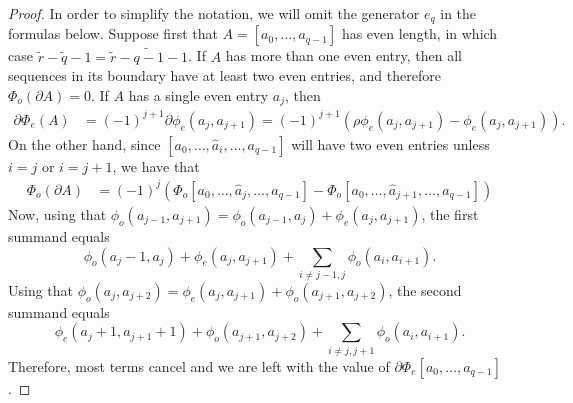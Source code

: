 \begin{proof} In order to simplify the notation, we will omit the generator $e_q$ in the formulas below. 
Suppose first that $A = [a_0,\ldots,a_{q-1}]$ has even length, in which case $\tilde{r}-\tilde{q}-1 = \tilde{r}-\widetilde{q-1}-1$. If $A$ has more than one even entry, then all sequences in its boundary have at least two even entries, and therefore $\Phi_o(\partial A) = 0$. If $A$ has a single even entry $a_j$, then 
\begin{align*}
    \partial \Phi_e(A) &= (-1)^{j+1}\partial \phi_e(a_j,a_{j+1}) = (-1)^{j+1}\left(\rho\phi_e(a_j,a_{j+1}
    ) - \phi_e(a_j,a_{j+1})\right).
\end{align*}
On the other hand, since $[a_0,\ldots,\hat{a}_i,\ldots,a_{q-1}]$ will have two even entries unless $i=j$ or $i=j+1$, we have that
\begin{align*}
    \Phi_o(\partial A) 
    &= (-1)^{j}\left(\Phi_o [a_0,\ldots,\hat{a}_j,\ldots,a_{q-1}]-\Phi_o [a_0,\ldots,\hat{a}_{j+1},\ldots,a_{q-1}]\right)
\end{align*}    
Now, using that $\phi_o(a_{j-1},a_{j+1}) = \phi_o(a_{j-1},a_j) + \phi_e(a_j,a_{j+1})$, the first summand equals
\[
\phi_o(a_j-1,a_j) + \phi_e(a_j,a_{j+1})+\sum_{i\neq j-1,j} \phi_o(a_i,a_{i+1}).
\]
Using that $\phi_o(a_{j},a_{j+2}) = \phi_e(a_j,a_{j+1})+\phi_o(a_{j+1},a_{j+2})$, the second summand equals
\[
\phi_e(a_j+1,a_{j+1}+1) + \phi_o(a_{j+1},a_{j+2})+\sum_{i\neq j,j+1} \phi_o(a_i,a_{i+1}).
\]
Therefore, most terms cancel and we are left with the value of $\partial \Phi_e[a_0,\ldots,a_{q-1}]$.


\end{proof}
